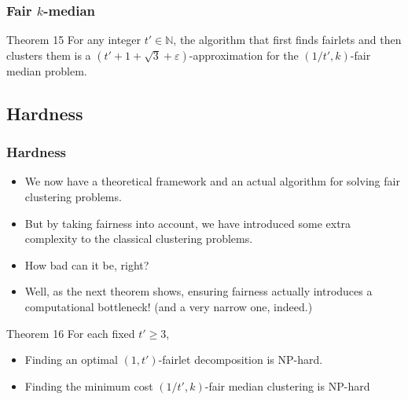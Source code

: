 \documentclass{beamer}
\begin{document}


\begin{frame}
\frametitle{Fair $k$-median}

\begin{block}{Theorem 15}
For any integer $t' \in \mathbb{N}$, the algorithm that first finds fairlets and then clusters them is a $(t' + 1 + \sqrt{3} + \varepsilon)$-approximation for the $(1/t', k)$-fair median problem.

\end{block}

\end{frame}


\subsection{Hardness}

\begin{frame}
\frametitle{Hardness}

\begin{itemize}
	\item We now have a theoretical framework and an actual algorithm for solving fair clustering problems. \pause
	
	\item But by taking fairness into account, we have introduced some extra complexity to the classical clustering problems. \pause
	
	\item How bad can it be, right? \pause
	
	\item Well, as the next theorem shows, ensuring fairness actually introduces a computational bottleneck! (and a very narrow one, indeed.) \pause
\end{itemize}

\begin{block}{Theorem 16}
For each fixed $t' \geq 3$,

\begin{itemize}
	\item Finding an optimal $(1, t')$-fairlet decomposition is \alert{NP-hard}.
	\item Finding the minimum cost $(1/t', k)$-fair median clustering is \alert{NP-hard}
\end{itemize}

\end{block}

\end{frame}
\end{document}
